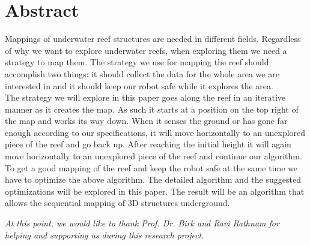 \documentclass[twoside, 12pt]{article}
\begin{document}
\thispagestyle{fancy} %


 \section*{Abstract}
 \label{sec:abstract}
 
Mappings of underwater reef structures are needed in different fields. Regardless of why we want to explore underwater reefs, when exploring them we need a strategy to map them. The strategy we use for mapping the reef should accomplish two things: it should collect the data for the whole area we are interested in and it should keep our robot safe while it explores the area.\\

The strategy we will explore in this paper goes along the reef in an iterative manner as it creates the map. As such it starts at a position on the top right of the map and works its way down. When it senses the ground or has gone far enough according to our specifications, it will move horizontally to an unexplored piece of the reef and go back up. After reaching the initial height it will again move horizontally to an unexplored piece of the reef and continue our algorithm.\\

To get a good mapping of the reef and keep the robot safe at the same time we have to optimize the above algorithm. The detailed algorithm and the suggested optimizations will be explored in this paper. The result will be an algorithm that allows the sequential mapping of 3D structures underground.\\

\newpage
\tableofcontents

\clearpage

\newpage
\thispagestyle{empty}
\vspace*{\fill}
\begin{center}

\vspace*{4cm}

\centering

\begin{quoting}
\begin{center}
\noindent
\textit{At this point, we would like to thank Prof. Dr. Birk and Ravi Rathnam for helping and supporting us during this research project.\\}
\end{center}
\end{quoting}

\vspace*{\fill}
\end{center}
\end{document}
